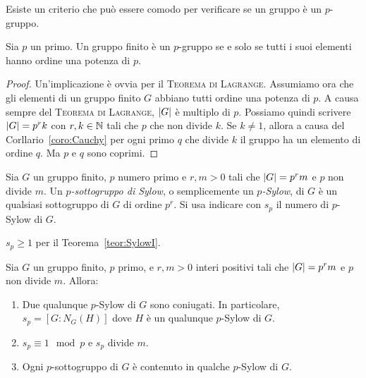 Esiste un criterio che può essere comodo per verificare se un gruppo è un $p$-gruppo.

\begin{coro}
Sia $p$ un primo. Un gruppo finito è un $p$-gruppo se e solo se tutti i suoi elementi hanno ordine una potenza di $p$.
\end{coro}

\begin{proof}
Un'implicazione è ovvia per il {\scshape Teorema di Lagrange}. Assumiamo ora che gli elementi di un gruppo finito $G$ abbiano tutti ordine una potenza di $p$. A causa sempre del {\scshape Teorema di Lagrange}, $\left\lvert G\right\rvert$ è multiplo di $p$. Possiamo quindi scrivere $\left\lvert G\right\rvert = p^r k$ con $r, k \in \mathbb{N}$ tali che $p$ che non divide $k$. Se $k \ne 1$, allora a causa del Corllario~\ref{coro:Cauchy} per ogni primo $q$ che divide $k$ il gruppo ha un elemento di ordine $q$. Ma $p$ e $q$ sono coprimi.
\end{proof}


\begin{defi}
Sia $G$ un gruppo finito, $p$ numero primo e $r,m > 0$ tali che $\left\lvert G\right\rvert=p^rm$ e $p$ non divide $m$. Un {\em $p$-sottogruppo di Sylow}, o semplicemente un {\em $p$-Sylow}, di $G$ è un qualsiasi sottogruppo di $G$ di ordine $p^r$. Si usa indicare con $s_p$ il numero di $p$-Sylow di $G$.
\end{defi}

\begin{osse}
$s_p\ge1$ per il Teorema~\ref{teor:SylowI}.
\end{osse}

\begin{teor}\label{teor:SylowII}
Sia $G$ un gruppo finito, $p$ primo, e $r,m > 0$ interi positivi tali che $\left\lvert G\right\rvert=p^rm$ e $p$ non divide $m$. Allora:
\begin{enumerate}
\item Due qualunque $p$-Sylow di $G$ sono coniugati. In particolare, $s_p = [G: N_G(H)]$ dove $H$ è un qualunque $p$-Sylow di $G$.
\item $s_p \equiv 1 \mod p$ e $s_p$ divide $m$.
\item Ogni $p$-sottogruppo di $G$ è contenuto in qualche $p$-Sylow di $G$.
\end{enumerate}
\end{teor}

